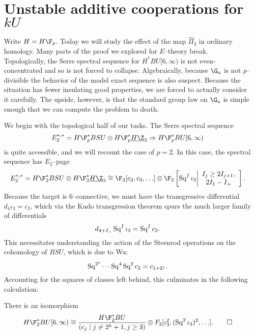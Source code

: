 \section{Unstable additive cooperations for \texorpdfstring{$kU$}{kU}}

Write $H = H\F_p$.  Today we will study the effect of the map $\hat \Pi_3$ in ordinary homology.  Many parts of the proof we explored for $E$--theory break.  Topologically, the Serre spectral sequence for $H^* BU[6, \infty)$ is not even-concentrated and so is not forced to collapse.  Algebraically, because $\G_a$ is not $p$--divisible the behavior of the model exact sequence is also suspect.  Because the situation has fewer insulating good properties, we are forced to actually consider it carefully.  The upside, however, is that the standard group law on $\G_a$ is simple enough that we can compute the problem to death.

We begin with the topological half of our tasks.  The Serre spectral sequence \[E_2^{*, *} = H\F_p^* BSU \otimes H\F_p^* \OS{H\Z}{3} \Rightarrow H\F_p^* BU[6, \infty)\] is quite accessible, and we will recount the case of $p = 2$.  In this case, the spectral sequence has $E_2$--page \[E_2^{*, *} = H\F_2^* BSU \otimes H\F_2^* \OS{H\Z}{3} \cong \F_2[c_2, c_3, \ldots] \otimes \F_2\left[\Sq^I \iota_3 \middle| \begin{array}{c} I_j \ge 2I_{j+1}, \\ 2 I_1 - I_+ \end{array}\right].\]   Because the target is $6$--connective, we must have the transgressive differential $d_4 \iota_3 = c_2$, which via the Kudo transgression theorem spurs the much larger family of differentials \[d_{4+I_+} \operatorname{Sq}^I \iota_3 = \operatorname{Sq}^I c_2.\]  This necessitates understanding the action of the Steenrod operations on the cohomology of $BSU$, which is due to Wu: \[\operatorname{Sq}^{2^j} \cdots \operatorname{Sq}^4 \operatorname{Sq}^2 c_2 = c_{1 + 2^j}.\]  Accounting for the squares of classes left behind, this culminates in the following calculation:

\begin{theorem}\label{HF2BU6Calculation}
There is an isomorphism \[H\F_2^* BU[6, \infty) \cong \frac{H\F_2^* BU}{(c_j \mid j \ne 2^k + 1, j \ge 3)} \otimes F_2[\iota_3^2, (\Sq^2 \iota_3)^2, \ldots]. \qed\]
\end{theorem}

